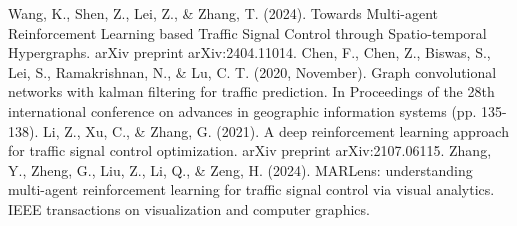 \documentclass[conference]{IEEEtran}
\begin{document}
\begin{thebibliography}{00}
 Wang, K., Shen, Z., Lei, Z., \& Zhang, T. (2024). Towards Multi-agent Reinforcement Learning based Traffic Signal Control through Spatio-temporal Hypergraphs. arXiv preprint arXiv:2404.11014.
 Chen, F., Chen, Z., Biswas, S., Lei, S., Ramakrishnan, N., \& Lu, C. T. (2020, November). Graph convolutional networks with kalman filtering for traffic prediction. In Proceedings of the 28th international conference on advances in geographic information systems (pp. 135-138).
 Li, Z., Xu, C., \& Zhang, G. (2021). A deep reinforcement learning approach for traffic signal control optimization. arXiv preprint arXiv:2107.06115.
 Zhang, Y., Zheng, G., Liu, Z., Li, Q., \& Zeng, H. (2024). MARLens: understanding multi-agent reinforcement learning for traffic signal control via visual analytics. IEEE transactions on visualization and computer graphics.
\end{thebibliography}
\end{document}
